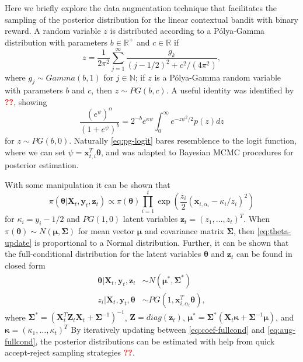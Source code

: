 \documentclass[12pt]{article}
\newcommand{\bred}[1]{\textbf{\textcolor{red}{#1}}}
\begin{document}
Here we briefly explore the data augmentation technique that facilitates the 
sampling of the posterior distribution for the linear contextual bandit with
binary reward.
A random variable $z$ is distributed according to a P\'olya-Gamma distribution
with parameters $b \in \mathbb{R}^{+}$ and $c \in \mathbb{R}$ if 
\begin{equation}
z = \frac{1}{2\pi^2} \sum_{j = 1}^\infty \frac{g_k}{(j - 1/2)^2 + c^2/(4\pi^2)},
\end{equation}
where 
$g_j \sim Gamma(b,1)$ 
for $j \in \mathbb{N}$; if $z$ is a P\'olya-Gamma random variable with parameters
$b$ and $c$, then $z \sim PG(b,c)$. 
A useful identity was identified by \bred{??}, showing
\begin{equation}
\frac{(e^\psi)^\alpha}{(1 + e^\psi)^b}
= 2^{-b}e^{\kappa\psi}
\int_0^\infty e^{-z\psi^2 / 2} p(z) dz
\label{eq:pg-logit}
\end{equation}
for $z \sim PG(b,0)$.
Naturally \eqref{eq:pg-logit} bares resemblence to the logit function, where we
can set $\psi = \bm{x}_{t,i}^T\bm{\theta}$, and was adapted to Bayesian MCMC 
procedures for posterior estimation.

With some manipulation it can be shown that
\begin{equation}
\pi(\bm{\theta} \vert \bm{X}_t, \bm{y}_t, \bm{z}_t)
\propto \pi(\bm{\theta})
\prod_{i = 1}^t \exp(\frac{z_i}{2} (\bm{x}_{i,\alpha_i} - \kappa_i/z_i)^2)
\label{eq:theta-update}
\end{equation}
for $\kappa_i = y_i - 1/2$ and $PG(1,0)$ latent variables 
$\bm{z}_t = (z_1, \ldots, z_t)^T$. 
When $\pi(\bm{\theta}) \sim N(\bm{\mu}, \bm{\Sigma})$ 
for mean vector $\bm{\mu}$ and covariance matrix $\bm{\Sigma}$, then
\eqref{eq:theta-update} is proportional to a Normal distribution.
Further, it can be shown that the full-conditional distribution for the latent
variables $\bm{\theta}$ and $\bm{z}_t$ can be found in closed form
\begin{align}
\bm{\theta} \vert \bm{X}_t, \bm{y}_t, \bm{z}_t & 
\sim N(\bm{\mu}^*, \bm{\Sigma}^*) \label{eq:coef-fullcond}\\
z_i \vert \bm{X}_t, \bm{y}_t, \bm{\theta} & 
\sim PG(1, \bm{x}_{i,\alpha_i}^T \bm{\theta}) \label{eq:aug-fullcond},
\end{align}
where 
$\bm{\Sigma}^* = (\bm{X}_t^T \bm{Z}_t \bm{X}_t + \bm{\Sigma}^{-1})^{-1}$,
$\bm{Z} = diag(\bm{z}_t)$,
$\bm{\mu}^* = \bm{\Sigma}^*(\bm{X}_t \bm{\kappa} + \bm{\Sigma}^{-1}\bm{\mu})$,
and 
$\bm{\kappa} = (\kappa_1, \ldots, \kappa_t)^T$
By iteratively updating between \eqref{eq:coef-fullcond} and 
\eqref{eq:aug-fullcond}, the posterior distributions can be estimated with 
help from quick accept-reject sampling strategies \bred{??}.
\end{document}
